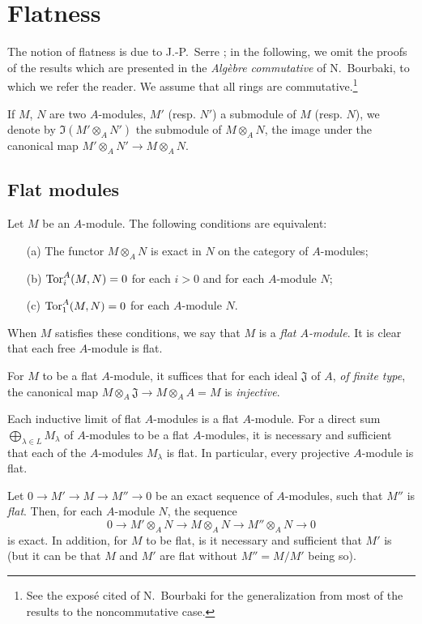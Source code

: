 \section{Flatness}
\label{section:0.6}

\begin{env}[6.0]
\label{0.6.0.0}
The notion of flatness is due to J.-P.~Serre \cite{I-16}; in the following, we omit the
proofs of the results which are presented in the \emph{Alg\`ebre commutative} of N.~Bourbaki,
to which we refer the reader. We assume that all rings are commutative.\footnote{See the
expos\'e cited of N.~Bourbaki for the generalization from most of the results to the
noncommutative case.}

If $M$, $N$ are two $A$-modules, $M'$ (resp. $N'$) a submodule of $M$ (resp. $N$), we denote
by $\Im(M'\otimes_A N')$ the submodule of $M\otimes_A N$, the image under the canonical map
$M'\otimes_A N'\to M\otimes_A N$.
\end{env}

\subsection{Flat modules}
\label{subsection:0.6.1}

\begin{env}[6.1.1]
\label{0.6.1.1}
Let $M$ be an $A$-module. The following conditions are equivalent:
\begin{enumerate}
  \item[(a)] The functor $M\otimes_A N$ is exact in $N$ on the category of $A$-modules;
  \item[(b)] $\operatorname{Tor}_i^A(M,N)=0$ for each $i>0$ and for each $A$-module $N$;
  \item[(c)] $\operatorname{Tor}_1^A(M,N)=0$ for each $A$-module $N$.
\end{enumerate}

When $M$ satisfies these conditions, we say that $M$ is a
\emph{flat $A$-module}. It is clear that each free $A$-module is flat.

For $M$ to be a flat $A$-module, it suffices that for each ideal $\mathfrak{J}$
of $A$, \emph{of finite type}, the canonical map
$M\otimes_A\mathfrak{J}\to M\otimes_A A=M$ is \emph{injective}.
\end{env}

\begin{env}[6.1.2]
\label{0.6.1.2}
Each inductive limit of flat $A$-modules is a flat $A$-module. For a direct sum
$\bigoplus_{\lambda\in L}M_\lambda$ of $A$-modules to be a flat $A$-modules, it
is necessary and sufficient that each of the $A$-modules $M_\lambda$ is flat. In
particular, every projective $A$-module is flat.

Let $0\to M'\to M\to M''\to 0$ be an exact sequence of $A$-modules, such that
$M''$ is \emph{flat}. Then, for each $A$-module $N$, the sequence
\[
  0\to M'\otimes_A N\to M\otimes_A N\to M''\otimes_A N\to 0
\]
is exact.
In addition, for $M$ to be flat, is it necessary and sufficient that $M'$ is (but it can be that $M$ and $M'$ are flat without $M''=M/M'$ being so).
\end{env}

